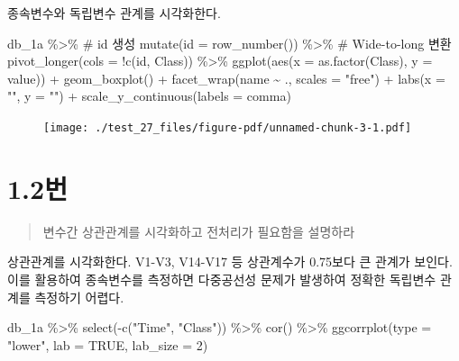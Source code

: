 \documentclass[
  letterpaper,
  DIV=11,
  numbers=noendperiod]{scrreprt}
\newenvironment{Shaded}{\begin{snugshade}}{\end{snugshade}}
\newcommand{\AttributeTok}[1]{\textcolor[rgb]{0.40,0.45,0.13}{#1}}
\newcommand{\CommentTok}[1]{\textcolor[rgb]{0.37,0.37,0.37}{#1}}
\newcommand{\ConstantTok}[1]{\textcolor[rgb]{0.56,0.35,0.01}{#1}}
\newcommand{\DecValTok}[1]{\textcolor[rgb]{0.68,0.00,0.00}{#1}}
\newcommand{\FunctionTok}[1]{\textcolor[rgb]{0.28,0.35,0.67}{#1}}
\newcommand{\NormalTok}[1]{\textcolor[rgb]{0.00,0.23,0.31}{#1}}
\newcommand{\SpecialCharTok}[1]{\textcolor[rgb]{0.37,0.37,0.37}{#1}}
\newcommand{\StringTok}[1]{\textcolor[rgb]{0.13,0.47,0.30}{#1}}
\begin{document}
종속변수와 독립변수 관계를 시각화한다.

\begin{Shaded}
\begin{Highlighting}[]
\NormalTok{db\_1a }\SpecialCharTok{\%\textgreater{}\%} 
  \CommentTok{\# id 생성}
  \FunctionTok{mutate}\NormalTok{(}\AttributeTok{id =} \FunctionTok{row\_number}\NormalTok{()) }\SpecialCharTok{\%\textgreater{}\%}
  \CommentTok{\# Wide{-}to{-}long 변환}
  \FunctionTok{pivot\_longer}\NormalTok{(}\AttributeTok{cols =} \SpecialCharTok{!}\FunctionTok{c}\NormalTok{(id, Class)) }\SpecialCharTok{\%\textgreater{}\%}
  \FunctionTok{ggplot}\NormalTok{(}\FunctionTok{aes}\NormalTok{(}\AttributeTok{x =} \FunctionTok{as.factor}\NormalTok{(Class), }\AttributeTok{y =}\NormalTok{ value)) }\SpecialCharTok{+}
  \FunctionTok{geom\_boxplot}\NormalTok{() }\SpecialCharTok{+}
  \FunctionTok{facet\_wrap}\NormalTok{(name }\SpecialCharTok{\textasciitilde{}}\NormalTok{ ., }\AttributeTok{scales =} \StringTok{"free"}\NormalTok{) }\SpecialCharTok{+}
  \FunctionTok{labs}\NormalTok{(}\AttributeTok{x =} \StringTok{""}\NormalTok{, }\AttributeTok{y =} \StringTok{""}\NormalTok{) }\SpecialCharTok{+}
  \FunctionTok{scale\_y\_continuous}\NormalTok{(}\AttributeTok{labels =}\NormalTok{ comma)}
\end{Highlighting}
\end{Shaded}

\begin{figure}[H]

{\centering \texttt{[image: ./test\_27\_files/figure-pdf/unnamed-chunk-3-1.pdf]}

}

\end{figure}

\hypertarget{uxbc88-2}{%
\section*{1.2번}\label{uxbc88-2}}


\begin{quote}
변수간 상관관계를 시각화하고 전처리가 필요함을 설명하라
\end{quote}

상관관계를 시각화한다. V1-V3, V14-V17 등 상관계수가 0.75보다 큰 관계가
보인다. 이를 활용하여 종속변수를 측정하면 다중공선성 문제가 발생하여
정확한 독립변수 관계를 측정하기 어렵다.

\begin{Shaded}
\begin{Highlighting}[]
\NormalTok{db\_1a }\SpecialCharTok{\%\textgreater{}\%} \FunctionTok{select}\NormalTok{(}\SpecialCharTok{{-}}\FunctionTok{c}\NormalTok{(}\StringTok{"Time"}\NormalTok{, }\StringTok{"Class"}\NormalTok{)) }\SpecialCharTok{\%\textgreater{}\%}
  \FunctionTok{cor}\NormalTok{() }\SpecialCharTok{\%\textgreater{}\%} \FunctionTok{ggcorrplot}\NormalTok{(}\AttributeTok{type =} \StringTok{"lower"}\NormalTok{, }\AttributeTok{lab =} \ConstantTok{TRUE}\NormalTok{, }\AttributeTok{lab\_size =} \DecValTok{2}\NormalTok{)}
\end{Highlighting}
\end{Shaded}
\end{document}
